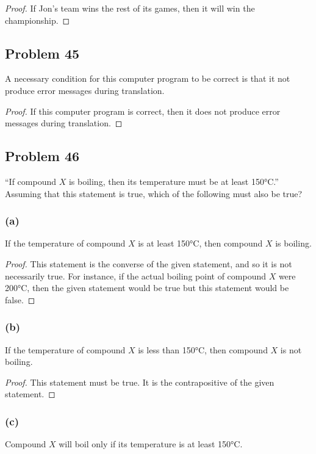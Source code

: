 \documentclass[14pt]{extarticle}
\begin{document}
\begin{proof}
If Jon’s team wins the rest of its games, then it will win the championship.
\end{proof}

\subsection{Problem 45}
A necessary condition for this computer program to be correct is that it not produce error messages during translation.

\begin{proof}
If this computer program is correct, then it does not produce error messages during translation.
\end{proof}

\subsection{Problem 46}
“If compound $X$ is boiling, then its temperature must be at least 150°C.” Assuming that this statement is true, which of the following must also be true?

\subsubsection{(a)}
If the temperature of compound $X$ is at least 150°C, then compound $X$ is boiling.

\begin{proof}
This statement is the converse of the given statement, and so it is not necessarily true. For instance, if the actual boiling point of compound $X$ were 200°C, then the given statement would be true but this statement would be false.
\end{proof}

\subsubsection{(b)}
If the temperature of compound $X$ is less than 150°C, then compound $X$ is not boiling.

\begin{proof}
This statement must be true. It is the contrapositive of the given statement.
\end{proof}

\subsubsection{(c)}
Compound $X$ will boil only if its temperature is at least 150°C.
\end{document}
